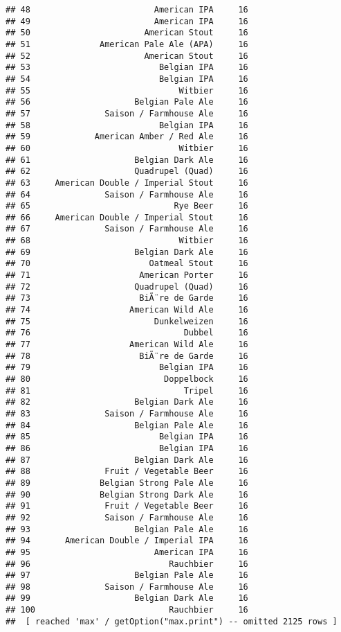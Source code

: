 \documentclass[
]{article}
\begin{document}
\begin{verbatim}
## 48                         American IPA     16
## 49                         American IPA     16
## 50                       American Stout     16
## 51              American Pale Ale (APA)     16
## 52                       American Stout     16
## 53                          Belgian IPA     16
## 54                          Belgian IPA     16
## 55                              Witbier     16
## 56                     Belgian Pale Ale     16
## 57               Saison / Farmhouse Ale     16
## 58                          Belgian IPA     16
## 59             American Amber / Red Ale     16
## 60                              Witbier     16
## 61                     Belgian Dark Ale     16
## 62                     Quadrupel (Quad)     16
## 63     American Double / Imperial Stout     16
## 64               Saison / Farmhouse Ale     16
## 65                             Rye Beer     16
## 66     American Double / Imperial Stout     16
## 67               Saison / Farmhouse Ale     16
## 68                              Witbier     16
## 69                     Belgian Dark Ale     16
## 70                        Oatmeal Stout     16
## 71                      American Porter     16
## 72                     Quadrupel (Quad)     16
## 73                      BiÃ¨re de Garde     16
## 74                    American Wild Ale     16
## 75                         Dunkelweizen     16
## 76                               Dubbel     16
## 77                    American Wild Ale     16
## 78                      BiÃ¨re de Garde     16
## 79                          Belgian IPA     16
## 80                           Doppelbock     16
## 81                               Tripel     16
## 82                     Belgian Dark Ale     16
## 83               Saison / Farmhouse Ale     16
## 84                     Belgian Pale Ale     16
## 85                          Belgian IPA     16
## 86                          Belgian IPA     16
## 87                     Belgian Dark Ale     16
## 88               Fruit / Vegetable Beer     16
## 89              Belgian Strong Pale Ale     16
## 90              Belgian Strong Dark Ale     16
## 91               Fruit / Vegetable Beer     16
## 92               Saison / Farmhouse Ale     16
## 93                     Belgian Pale Ale     16
## 94       American Double / Imperial IPA     16
## 95                         American IPA     16
## 96                            Rauchbier     16
## 97                     Belgian Pale Ale     16
## 98               Saison / Farmhouse Ale     16
## 99                     Belgian Dark Ale     16
## 100                           Rauchbier     16
##  [ reached 'max' / getOption("max.print") -- omitted 2125 rows ]
\end{verbatim}
\end{document}
